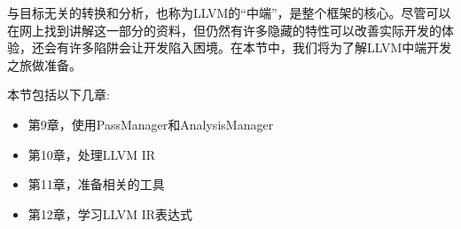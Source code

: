 
与目标无关的转换和分析，也称为LLVM的“中端”，是整个框架的核心。尽管可以在网上找到讲解这一部分的资料，但仍然有许多隐藏的特性可以改善实际开发的体验，还会有许多陷阱会让开发陷入困境。在本节中，我们将为了解LLVM中端开发之旅做准备。

本节包括以下几章:\par

\begin{itemize}
	\item 第9章，使用PassManager和AnalysisManager
	\item 第10章，处理LLVM IR
	\item 第11章，准备相关的工具
	\item 第12章，学习LLVM IR表达式
\end{itemize}

\newpage